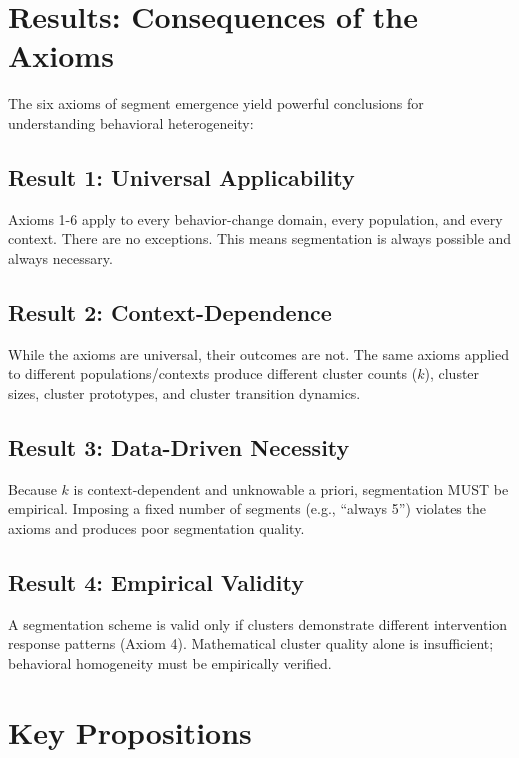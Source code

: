 \section{Results: Consequences of the Axioms}
\label{sec:ba-results}

The six axioms of segment emergence yield powerful conclusions for understanding
behavioral heterogeneity:

\subsection{Result 1: Universal Applicability}
Axioms 1-6 apply to every behavior-change domain, every population, and every
context. There are no exceptions. This means segmentation is always possible and
always necessary.

\subsection{Result 2: Context-Dependence}
While the axioms are universal, their outcomes are not. The same axioms applied
to different populations/contexts produce different cluster counts ($k$), cluster
sizes, cluster prototypes, and cluster transition dynamics.

\subsection{Result 3: Data-Driven Necessity}
Because $k$ is context-dependent and unknowable a priori, segmentation MUST be
empirical. Imposing a fixed number of segments (e.g., ``always 5'') violates the
axioms and produces poor segmentation quality.

\subsection{Result 4: Empirical Validity}
A segmentation scheme is valid only if clusters demonstrate different intervention
response patterns (Axiom 4). Mathematical cluster quality alone is insufficient;
behavioral homogeneity must be empirically verified.

\section{Key Propositions}
\label{sec:ba-propositions}

